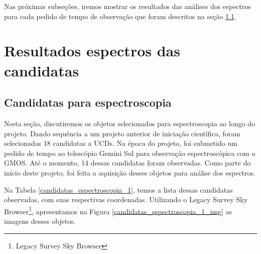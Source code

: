 Nas próximas subseções, iremos mostrar os resultados das análises dos espectros para cada pedido de tempo de observação que foram descritos na seção \ref{sec:candidatas_espectroscopia}.

\section{Resultados espectros das candidatas}\label{sec:analise_espectros}
\subsection{Candidatas para espectroscopia}\label{sec:candidatas_espectroscopia}
Nesta seção, discutiremos os objetos selecionados para espectroscopia ao longo do projeto. Dando sequência a um projeto anterior de iniciação científica, foram selecionadas 18 candidatas a UCDs. Na época do projeto, foi submetido um pedido de tempo ao telescópio Gemini Sul para observação espectroscópica com o GMOS. Até o momento, 14 dessas candidatas foram observadas. Como parte do início deste projeto, foi feita a aquisição desses objetos para análise dos espectros.

Na Tabela \ref{candidatas_espectroscopia_1}, temos a lista dessas candidatas observadas, com suas respectivas coordenadas. Utilizando o Legacy Survey Sky Browser\footnote{Legacy Survey Sky Browser}, apresentamos na Figura \ref{candidatas_espectroscopia_1_img} as imagens desses objetos.

